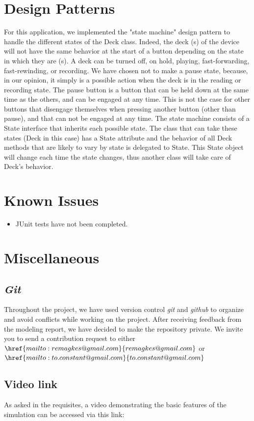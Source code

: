 \documentclass[11pt]{article}
\begin{document}
\section{Design Patterns}
For this application, we implemented the "state machine" design pattern to handle the different states of the Deck class. Indeed, the deck (s) of the device will not have the same behavior at the start of a button depending on the state in which they are (s). A deck can be turned off, on hold, playing, fast-forwarding, fast-rewinding, or recording. We have chosen not to make a pause state, because, in our opinion, it simply is a possible action when the deck is in the reading or recording state. The pause button is a button that can be held down at the same time as the others, and can be engaged at any time. This is not the case for other buttons that disengage themselves when pressing another button (other than pause), and that can not be engaged at any time.
The state machine consists of a State interface that inherits each possible state. The class that can take these states (Deck in this case) has a State attribute and the behavior of all Deck methods that are likely to vary by state is delegated to State. This State object will change each time the state changes, thus another class will take care of Deck's behavior.
\section{Known Issues}
\begin{itemize}
\item JUnit tests have not been completed.
\end{itemize}
\section{Miscellaneous}
\subsection{\textit{Git}}
Throughout the project, we have used version control \textit{git} and \textit{github} to organize and avoid conflicts while working on the project. After receiving feedback from the modeling report, we have decided to make the repository private. We invite you to send a contribution request to either $\href{mailto:remagkes@gmail.com}{remagkes@gmail.com} $ or $\href{mailto:to.constant@gmail.com}{to.constant@gmail.com}$
\subsection{Video link}
As asked in the requisites, a video demonstrating the basic features of the simulation can be accessed via this link: 
\end{document}
